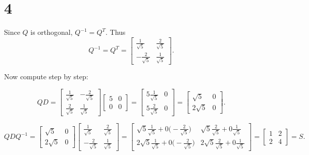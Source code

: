 \documentclass{article}
\begin{document}
\section*{4}

Since $Q$ is orthogonal, $Q^{-1}=Q^T$.  Thus
\[
  Q^{-1} = Q^T = \begin{bmatrix}
    \tfrac{1}{\sqrt5} & \tfrac{2}{\sqrt5}\\[4pt]
    -\tfrac{2}{\sqrt5} & \tfrac{1}{\sqrt5}
  \end{bmatrix}.
\]

Now compute step by step:

\[
  QD =
  \begin{bmatrix}
    \tfrac{1}{\sqrt5}&-\tfrac{2}{\sqrt5}\\[4pt]
    \tfrac{2}{\sqrt5}& \tfrac{1}{\sqrt5}
  \end{bmatrix}
  \begin{bmatrix}5&0\\0&0\end{bmatrix}
  =
  \begin{bmatrix}
    5\tfrac{1}{\sqrt5} & 0\\[4pt]
    5\tfrac{2}{\sqrt5} & 0
  \end{bmatrix}
  =
  \begin{bmatrix}
    \sqrt5 & 0\\[4pt]
    2\sqrt5 & 0
  \end{bmatrix}.
\]

\[
  QDQ^{-1} =
  \begin{bmatrix}
    \sqrt5 & 0\\[4pt]
    2\sqrt5 & 0
  \end{bmatrix}
  \begin{bmatrix}
    \tfrac{1}{\sqrt5}&\tfrac{2}{\sqrt5}\\[4pt]
    -\tfrac{2}{\sqrt5}&\tfrac{1}{\sqrt5}
  \end{bmatrix}
  =
  \begin{bmatrix}
    \sqrt5\tfrac{1}{\sqrt5} + 0\bigl(-\tfrac{2}{\sqrt5}\bigr)
      & \sqrt5\tfrac{2}{\sqrt5} + 0\tfrac{1}{\sqrt5}\\[6pt]
    2\sqrt5\tfrac{1}{\sqrt5} + 0\bigl(-\tfrac{2}{\sqrt5}\bigr)
      & 2\sqrt5\tfrac{2}{\sqrt5} + 0\tfrac{1}{\sqrt5}
  \end{bmatrix}
  =
  \begin{bmatrix}
    1 & 2\\[4pt]
    2 & 4
  \end{bmatrix}
  = S.
\]
\end{document}
